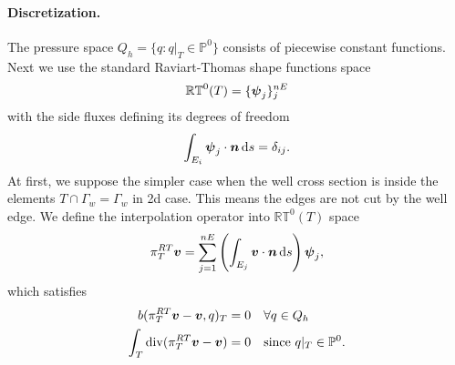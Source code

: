 \paragraph{Discretization.}
The pressure space $Q_h=\{q: q|_T\in \mathbb{P}^0\}$ consists of piecewise constant functions.
Next we use the standard Raviart-Thomas shape functions space
\begin{equation}
    \mathbb{RT}^0(T) = \{\mathbf{\boldsymbol{\psi}}_j\}_j^{nE}
\end{equation}
with the side fluxes defining its degrees of freedom
\begin{equation}
    \int_{E_i} \mathbf{\boldsymbol{\psi}}_j \cdot \mathbf{\boldsymbol{n}} \,{\rm d} s = \delta_{ij}.
\end{equation}
At first, we suppose the simpler case when the well cross section is
inside the elements $T\cap\Gamma_w = \Gamma_w$ in 2d case.
This means the edges are not cut by the well edge.
We define the interpolation operator into $\mathbb{RT}^0(T)$ space
\begin{equation}
    \pi^{RT}_T\mathbf{\boldsymbol{v}} = \sum_{j=1}^{nE} \left( \int_{E_j} \mathbf{\boldsymbol{v}} \cdot \mathbf{\boldsymbol{n}} \,{\rm d} s \right)  \mathbf{\boldsymbol{\psi}}_j, \label{eqn:local_rt_interpolator}
\end{equation}
which satisfies
\begin{align}
b(\pi^{RT}_T\mathbf{\boldsymbol{v}}- \mathbf{\boldsymbol{v}}, q)_T &= 0 \quad \forall q\in Q_h\\ 
\int_T {\rm div}(\pi^{RT}_T\mathbf{\boldsymbol{v}}- \mathbf{\boldsymbol{v}}) &= 0 \quad \textrm{since } q|_T\in \mathbb{P}^0.
\end{align}



